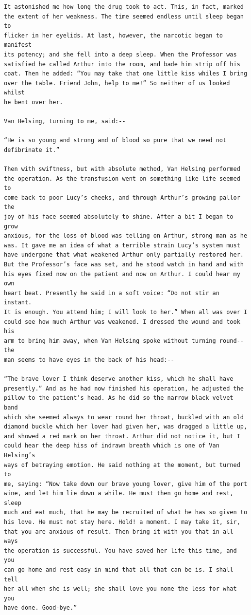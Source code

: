 \documentclass{article}
\begin{document}
\begin{verbatim}
It astonished me how long the drug took to act. This, in fact, marked
the extent of her weakness. The time seemed endless until sleep began to
flicker in her eyelids. At last, however, the narcotic began to manifest
its potency; and she fell into a deep sleep. When the Professor was
satisfied he called Arthur into the room, and bade him strip off his
coat. Then he added: “You may take that one little kiss whiles I bring
over the table. Friend John, help to me!” So neither of us looked whilst
he bent over her.

Van Helsing, turning to me, said:--

“He is so young and strong and of blood so pure that we need not
defibrinate it.”

Then with swiftness, but with absolute method, Van Helsing performed
the operation. As the transfusion went on something like life seemed to
come back to poor Lucy’s cheeks, and through Arthur’s growing pallor the
joy of his face seemed absolutely to shine. After a bit I began to grow
anxious, for the loss of blood was telling on Arthur, strong man as he
was. It gave me an idea of what a terrible strain Lucy’s system must
have undergone that what weakened Arthur only partially restored her.
But the Professor’s face was set, and he stood watch in hand and with
his eyes fixed now on the patient and now on Arthur. I could hear my own
heart beat. Presently he said in a soft voice: “Do not stir an instant.
It is enough. You attend him; I will look to her.” When all was over I
could see how much Arthur was weakened. I dressed the wound and took his
arm to bring him away, when Van Helsing spoke without turning round--the
man seems to have eyes in the back of his head:--

“The brave lover I think deserve another kiss, which he shall have
presently.” And as he had now finished his operation, he adjusted the
pillow to the patient’s head. As he did so the narrow black velvet band
which she seemed always to wear round her throat, buckled with an old
diamond buckle which her lover had given her, was dragged a little up,
and showed a red mark on her throat. Arthur did not notice it, but I
could hear the deep hiss of indrawn breath which is one of Van Helsing’s
ways of betraying emotion. He said nothing at the moment, but turned to
me, saying: “Now take down our brave young lover, give him of the port
wine, and let him lie down a while. He must then go home and rest, sleep
much and eat much, that he may be recruited of what he has so given to
his love. He must not stay here. Hold! a moment. I may take it, sir,
that you are anxious of result. Then bring it with you that in all ways
the operation is successful. You have saved her life this time, and you
can go home and rest easy in mind that all that can be is. I shall tell
her all when she is well; she shall love you none the less for what you
have done. Good-bye.”


\end{verbatim}
\end{document}
